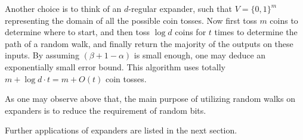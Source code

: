 Another choice is to think of an $d$-regular expander, such that
$V=\{0,1\}^m$ representing the domain of all the possible coin
tosses. Now first toss $m$ coins to determine where to start, and
then toss $\log{d}$ coins for $t$ times to determine the path of a
random walk, and finally return the majority of the outputs on these
inputs. By assuming $(\beta+1-\alpha)$ is small enough, one may
deduce an exponentially small error bound. This algorithm uses
totally $m+\log{d}\cdot t=m+O(t)$ coin tosses.

As one may observe above that, the main purpose of utilizing random
walks on expanders is to reduce the requirement of random bits.

Further applications of expanders are listed in the next section.
